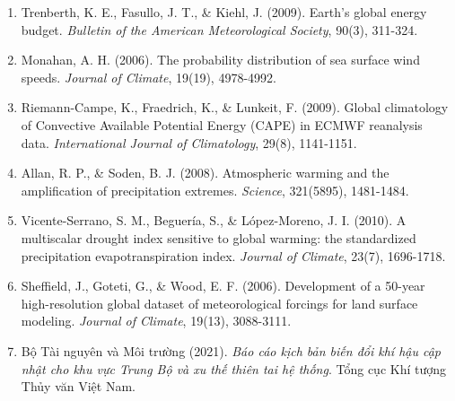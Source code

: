 \documentclass[12pt,a4paper]{article}
\begin{document}
\begin{enumerate}
    \item Trenberth, K. E., Fasullo, J. T., \& Kiehl, J. (2009). Earth's global energy budget. \textit{Bulletin of the American Meteorological Society}, 90(3), 311-324.
    
    \item Monahan, A. H. (2006). The probability distribution of sea surface wind speeds. \textit{Journal of Climate}, 19(19), 4978-4992.
    
    \item Riemann-Campe, K., Fraedrich, K., \& Lunkeit, F. (2009). Global climatology of Convective Available Potential Energy (CAPE) in ECMWF reanalysis data. \textit{International Journal of Climatology}, 29(8), 1141-1151.
    
    \item Allan, R. P., \& Soden, B. J. (2008). Atmospheric warming and the amplification of precipitation extremes. \textit{Science}, 321(5895), 1481-1484.

    \item Vicente-Serrano, S. M., Beguería, S., \& López-Moreno, J. I. (2010). A multiscalar drought index sensitive to global warming: the standardized precipitation evapotranspiration index. \textit{Journal of Climate}, 23(7), 1696-1718.
    
    \item Sheffield, J., Goteti, G., \& Wood, E. F. (2006). Development of a 50-year high-resolution global dataset of meteorological forcings for land surface modeling. \textit{Journal of Climate}, 19(13), 3088-3111.
    
    \item Bộ Tài nguyên và Môi trường (2021). \textit{Báo cáo kịch bản biến đổi khí hậu cập nhật cho khu vực Trung Bộ và xu thế thiên tai hệ thống}. Tổng cục Khí tượng Thủy văn Việt Nam.
\end{enumerate}
\end{document}

